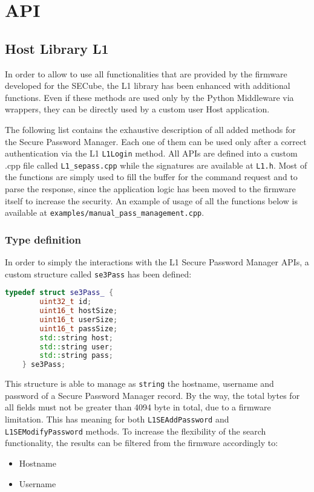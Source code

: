 \chapter{API}
\label{api}


\section{Host Library L1}
In order to allow to use all functionalities that are provided by the firmware developed for the SECube, the L1 library has been enhanced with additional functions. Even if these methods are used only by the Python Middleware via wrappers, they can be directly used by a custom user Host application.

The following list contains the exhaustive description of all added methods for the Secure Password Manager. Each one of them can be used only after a correct authentication via the L1 \texttt{L1Login} method. All APIs are defined into a custom .cpp file called \texttt{L1\_sepass.cpp} while the signatures are available at \texttt{L1.h}.\newline\newline
Most of the functions are simply used to fill the buffer for the command request and to parse the response, since the application logic has been moved to the firmware itself to increase the security. An example of usage of all the functions below is available at \texttt{examples/manual\_pass\_management.cpp}.

\subsection{Type definition}
In order to simply the interactions with the L1 Secure Password Manager APIs, a custom structure called \texttt{se3Pass} has been defined:
\begin{lstlisting}[language=C++,breaklines=true]
	typedef struct se3Pass_ {
		uint32_t id;
		uint16_t hostSize;
		uint16_t userSize;
		uint16_t passSize;
		std::string host;
		std::string user;
		std::string pass;
	} se3Pass;
\end{lstlisting}

This structure is able to manage as \texttt{string} the hostname, username and password of a Secure Password Manager record. By the way, the total bytes for all fields must not be greater than 4094 byte in total, due to a firmware limitation. This has meaning for both \texttt{L1SEAddPassword} and \texttt{L1SEModifyPassword} methods.\newline\newline
To increase the flexibility of the search functionality, the results can be filtered from the firmware accordingly to:
\begin{itemize}
	\item Hostname
	\item Username
\end{itemize}

